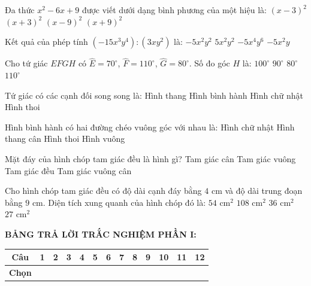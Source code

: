 \documentclass[12pt,a4paper]{article}
\begin{document}
\begin{ex}
Đa thức $x^2 - 6x + 9$ được viết dưới dạng bình phương của một hiệu là:
\choice
{\True $(x - 3)^2$}
{$(x + 3)^2$}
{$(x - 9)^2$}
{$(x + 9)^2$}
\end{ex}

\begin{ex}
Kết quả của phép tính $(-15x^3y^4) : (3xy^2)$ là:
\choice
{\True $-5x^2y^2$}
{$5x^2y^2$}
{$-5x^4y^6$}
{$-5x^2y$}
\end{ex}

\begin{ex}
Cho tứ giác $EFGH$ có $\widehat{E} = 70^\circ$, $\widehat{F} = 110^\circ$, $\widehat{G} = 80^\circ$. Số đo góc $H$ là:
\choice
{\True $100^\circ$}
{$90^\circ$}
{$80^\circ$}
{$110^\circ$}
\end{ex}

\begin{ex}
Tứ giác có các cạnh đối song song là:
\choice
{Hình thang}
{\True Hình bình hành}
{Hình chữ nhật}
{Hình thoi}
\end{ex}

\begin{ex}
Hình bình hành có hai đường chéo vuông góc với nhau là:
\choice
{Hình chữ nhật}
{Hình thang cân}
{\True Hình thoi}
{Hình vuông}
\end{ex}

\begin{ex}
Mặt đáy của hình chóp tam giác đều là hình gì?
\choice
{Tam giác cân}
{Tam giác vuông}
{\True Tam giác đều}
{Tam giác vuông cân}
\end{ex}

\begin{ex}
Cho hình chóp tam giác đều có độ dài cạnh đáy bằng $4\text{ cm}$ và độ dài trung đoạn bằng $9\text{ cm}$. Diện tích xung quanh của hình chóp đó là:
\choice
{\True $54\text{ cm}^2$}
{$108\text{ cm}^2$}
{$36\text{ cm}^2$}
{$27\text{ cm}^2$}
\end{ex}


\vspace{1mm}
\noindent\textbf{BẢNG TRẢ LỜI TRẮC NGHIỆM PHẦN I:}
\begin{center}
\begin{tabular}{|c|c|c|c|c|c|c|c|c|c|c|c|c|}
\hline
\textbf{Câu} & \textbf{1} & \textbf{2} & \textbf{3} & \textbf{4} & \textbf{5} & \textbf{6} & \textbf{7} & \textbf{8} & \textbf{9} & \textbf{10} & \textbf{11} & \textbf{12} \\
\hline
\textbf{Chọn} & \rule{0pt}{0.65cm} & & & & & & & & & & & \\
\hline
\end{tabular}
\end{center}
\vspace{2mm}
\end{document}
